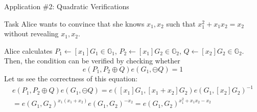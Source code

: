 \documentclass{zkdl-presentation-template}
\begin{document}
    \begin{frame}{Application \#2: Quadratic Verifications}
        \begin{block}{Task}
            Alice wants to convince that she knows $x_1,x_2$ such that $x_1^2+x_1x_2=x_2$ without revealing $x_1,x_2$.
        \end{block}

        \pause\begin{example}
            Alice calculates $P_1 \gets [x_1]G_1 \in \mathbb{G}_1$, $P_2 \gets [x_1]G_2 \in \mathbb{G}_2$, $Q \gets [x_2]G_2 \in \mathbb{G}_2$. Then, the condition can be verified by checking whether
            \begin{equation*}
                e(P_1,P_2\oplus Q)e(G_1,\ominus Q) = 1
            \end{equation*}
            \pause Let us see the correctness of this equation:
            \begin{gather*}
                e(P_1,P_2\oplus Q)e(G_1,\ominus Q) = e([x_1]G_1,[x_1+x_2]G_2)e(G_1,[x_2]G_2)^{-1} \\= e(G_1,G_2)^{x_1(x_1+x_2)}e(G_1,G_2)^{-x_2} = e(G_1,G_2)^{x_1^2+x_1x_2-x_2}
            \end{gather*}
        \end{example}
    \end{frame}

    \makeclosingframe
\end{document}
